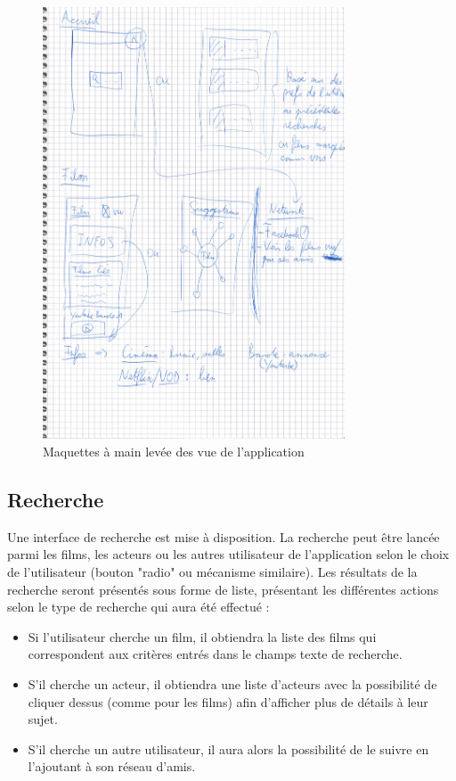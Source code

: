 \begin{figure}
    \begin{center}
        \includegraphics[width=0.8\textwidth]{img/maquettes.jpg}
    \end{center}
    \caption{Maquettes à main levée des vue de l'application}
    \label{maquettes}
\end{figure}

\subsection{Recherche}
Une interface de recherche est mise à disposition. La recherche peut être lancée parmi les films, les acteurs ou les autres utilisateur de l'application selon le choix de l'utilisateur (bouton "radio" ou mécanisme similaire).
Les résultats de la recherche seront présentés sous forme de liste, présentant les différentes actions selon le type de recherche qui aura été effectué :
\begin{itemize}
    \item Si l'utilisateur cherche un film, il obtiendra la liste des films qui correspondent aux critères entrés dans le champs texte de recherche.
    \item S'il cherche un acteur, il obtiendra une liste d'acteurs avec la possibilité de cliquer dessus (comme pour les films) afin d'afficher plus de détails à leur sujet.
    \item S'il cherche un autre utilisateur, il aura alors la possibilité de le suivre en l'ajoutant à son réseau d'amis.
\end{itemize}


